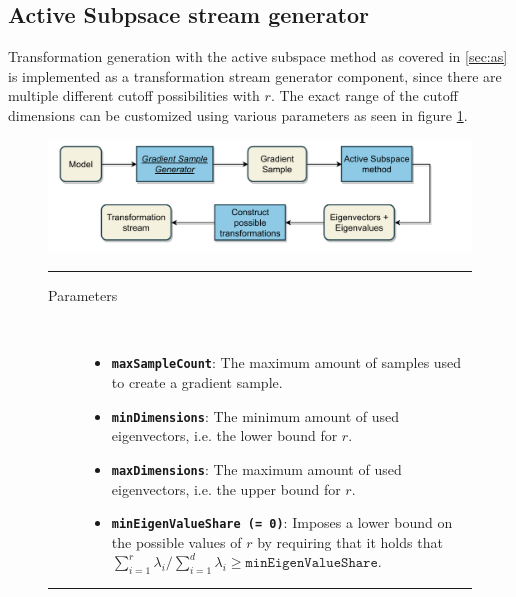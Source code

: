 \documentclass[
  a4paper,  %
  twoside,  %
  bibliography=totoc,
  headsepline,
  cleardoublepage=empty,
  parskip=half,
  draft=false
]{scrbook}
\newcommand{\delimit}{{\color{silver}\noindent\rule{\textwidth}{1pt}}}
\begin{document}
\newpage

\subsection{Active Subpsace stream generator}

Transformation generation with the active subspace method as covered in \cref{sec:as} is implemented as a transformation stream generator component, since there are multiple different cutoff possibilities with $r$.
The exact range of the cutoff dimensions can be customized using various parameters as seen in figure \cref{fig:astsg}.

\begin{mdframed}[style=style,frametitle={Transformation stream generator (active subspaces)}]
\begin{figure}[H]
\vspace{5px}
\includegraphics[width=\textwidth]{graphics/TransformationStreamGen_AS.pdf}

\delimit

\begin{description}
\item[Parameters] {~ \begin{itemize}[\indent{}]
\item \texttt{\textbf{maxSampleCount}}: The maximum amount of samples used to create a gradient sample.
\item \texttt{\textbf{minDimensions}}: The minimum amount of used eigenvectors, i.e. the lower bound for $r$.
\item \texttt{\textbf{maxDimensions}}: The maximum amount of used eigenvectors, i.e. the upper bound for $r$.
\item \texttt{\textbf{minEigenValueShare (= 0)}}: Imposes a lower bound on the possible values of $r$ by requiring that it holds that $\sum_{i=1}^r \lambda_i / \sum_{i=1}^d \lambda_i \geq \texttt{minEigenValueShare}$.
\end{itemize}}
\end{description}
\delimit
{}
\label{fig:astsg}
\end{figure}
\end{mdframed}
\end{document}
